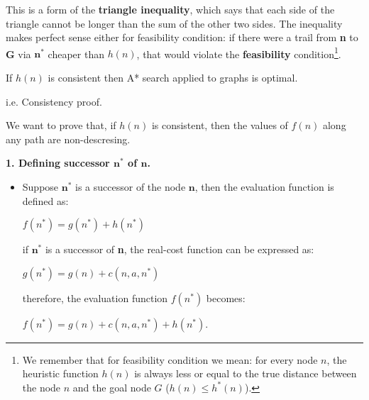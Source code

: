 This is a form of the \textbf{triangle inequality}, which says that each side of the triangle cannot be longer than the sum of the other two sides. The inequality makes 
perfect sense either for feasibility condition: if there were a trail from \textbf{n} to \textbf{G} via $\mathbf{n^*}$ cheaper than $h(n)$, that would violate the 
\textbf{feasibility} condition\footnote{We remember that for feasibility condition we mean: for every node $n$, the heuristic function $h(n)$ is always less or equal to the true distance between the node $n$ and the goal node $G$ ($h(n) \le h^*(n)$).}. 
\begin{definition}[title={Consistency theorem}]
    If $h(n)$ is consistent then A* search applied to graphs is optimal.
\end{definition}
\begin{example}
    i.e. Consistency proof. \vspace{3.5pt}
    \begin{center}
    \end{center} \vspace{3.5pt}

    We want to prove that, if $h(n)$ is consistent, then the values of $f(n)$ along any path are non-descresing. \vspace{7pt}

    \textbf{1. Defining successor $\mathbf{n^*}$ of $\mathbf{n}$.}
    \begin{itemize}
        \renewcommand{\labelitemi}{}
        \item \vspace{3.5pt}
        Suppose $\mathbf{n^*}$ is a successor of the node $\mathbf{n}$, then the evaluation function is defined as: \vspace{3.5pt}
        \begin{center}
            $f(n^*) = g(n^*) + h(n^*)$
        \end{center} \vspace{3.5pt}

        if $\mathbf{n^*}$ is a successor of \textbf{n}, the real-cost function can be expressed as: \vspace{3.5pt}
        \begin{center}
            $g(n^*) = g(n) + c(n, a, n^*)$
        \end{center} \vspace{3.5pt}

        therefore, the evaluation function $f(n^*)$ becomes: \vspace{3.5pt}
        \begin{center}
            $f(n^*) = g(n) + c(n, a, n^*) + h(n^*)$.
        \end{center} \vspace{3.5pt}
    \end{itemize}


\end{example}
